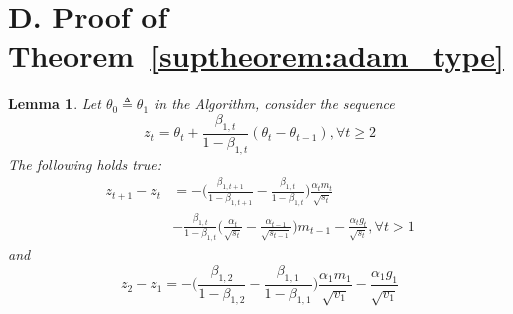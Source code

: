 \documentclass{article}
\newtheorem{lemma}[theorem]{Lemma}
\begin{document}
\section*{D. Proof of Theorem~\ref{suptheorem:adam_type}} 
\begin{lemma} \cite{chen2018convergence}
\label{suplemma:6.1}
Let $\theta_0 \triangleq \theta_1$ in the Algorithm, consider the sequence
\begin{equation*}
    z_t = \theta_t + \frac{\beta_{1,t}}{1-\beta_{1,t}} (\theta_t - \theta_{t-1}), \forall t \geq 2
\end{equation*}
The following holds true:
\begin{align}
    z_{t+1} - z_t &= - \Big( \frac{\beta_{1,t+1}}{1-\beta_{1, t+1}} - \frac{\beta_{1,t}}{1-\beta_{1, t}} \Big) \frac{\alpha_t m_t}{\sqrt{s_t}} \nonumber \\
    &- \frac{\beta_{1,t}}{1 - \beta_{1,t}} \Big( \frac{\alpha_t}{\sqrt{s_t}} - \frac{\alpha_{t-1}}{\sqrt{s_{t-1}}} \Big) m_{t-1} - \frac{\alpha_t g_t}{\sqrt{s_t}}, \forall t > 1
\end{align}
and 
\begin{equation}
    z_2 - z_1 = -\Big( \frac{\beta_{1,2}}{1 - \beta_{1,2}} - \frac{\beta_{1,1}}{1 - \beta_{1,1}} \Big) \frac{\alpha_1 m_1}{\sqrt{v_1}} - \frac{\alpha_1 g_1}{\sqrt{v_1}} 
\end{equation}
\end{lemma}
\end{document}
